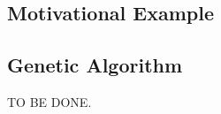 \subsection{Motivational Example} \label{sec:motivation}


\subsection{Genetic Algorithm}
TO BE DONE.

